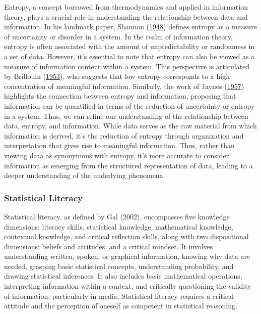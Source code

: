 \documentclass[
  12pt,
  a4paper,
  twoside]{article}
\begin{document}
Entropy, a concept borrowed from thermodynamics and applied in information theory, plays a crucial role in understanding the relationship between data and information. In his landmark paper, Shannon (\protect\hyperlink{ref-shannon1948}{1948}) defines entropy as a measure of uncertainty or disorder in a system. In the realm of information theory, entropy is often associated with the amount of unpredictability or randomness in a set of data.
However, it's essential to note that entropy can also be viewed as a measure of information content within a system. This perspective is articulated by Brillouin (\protect\hyperlink{ref-brillouin1953}{1953}), who suggests that low entropy corresponds to a high concentration of meaningful information. Similarly, the work of Jaynes (\protect\hyperlink{ref-jaynes1957}{1957}) highlights the connection between entropy and information, proposing that information can be quantified in terms of the reduction of uncertainty or entropy in a system.
Thus, we can refine our understanding of the relationship between data, entropy, and information. While data serves as the raw material from which information is derived, it's the reduction of entropy through organization and interpretation that gives rise to meaningful information. Thus, rather than viewing data as synonymous with entropy, it's more accurate to consider information as emerging from the structured representation of data, leading to a deeper understanding of the underlying phenomena.

\hypertarget{statistical-literacy}{%
\subsubsection{Statistical Literacy}\label{statistical-literacy}}

Statistical literacy, as defined by Gal (2002), encompasses five knowledge dimensions: literacy skills, statistical knowledge, mathematical knowledge, contextual knowledge, and critical reflection skills, along with two dispositional dimensions: beliefs and attitudes, and a critical mindset. It involves understanding written, spoken, or graphical information, knowing why data are needed, grasping basic statistical concepts, understanding probability, and drawing statistical inferences. It also includes basic mathematical operations, interpreting information within a context, and critically questioning the validity of information, particularly in media. Statistical literacy requires a critical attitude and the perception of oneself as competent in statistical reasoning.
\end{document}
